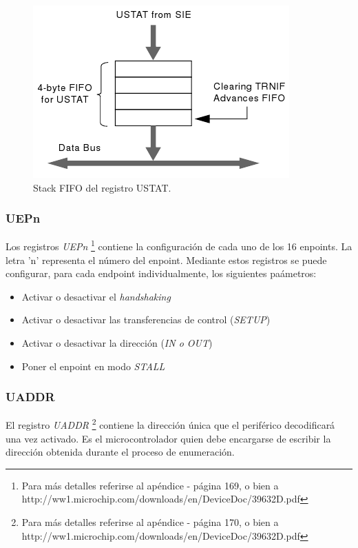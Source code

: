 \begin{figure}[htp]
\centering
\includegraphics[scale=0.6]{./img/ustat_fifo.png}
\caption{Stack FIFO del registro USTAT.}
\label{fig:ustat_fifo}
\end{figure}

\subsubsection{UEPn}
Los registros \emph{UEPn} \footnote{Para m\'as detalles referirse al
ap\'endice - 
p\'agina 169, o bien a
http://ww1.microchip.com/downloads/en/DeviceDoc/39632D.pdf} contiene la
configuraci\'on de cada uno de los 16 enpoints. La letra 'n' representa el
n\'umero del enpoint.
Mediante estos registros se puede configurar, para cada endpoint
individualmente, los siguientes pa\'ametros:

\begin{itemize}
 \item Activar o desactivar el \emph{handshaking}

 \item Activar o desactivar las transferencias de control (\emph{SETUP})

 \item Activar o desactivar la direcci\'on (\emph{IN o OUT})

 \item Poner el enpoint en modo \emph{STALL}
\end{itemize}


\subsubsection{UADDR}
El registro \emph{UADDR} \footnote{Para m\'as detalles referirse al
ap\'endice - 
p\'agina 170, o bien a
http://ww1.microchip.com/downloads/en/DeviceDoc/39632D.pdf} contiene la
direcci\'on \'unica que el perif\'erico decodificar\'a una vez activado. Es el
microcontrolador quien debe encargarse de escribir la direcci\'on obtenida
durante el proceso de enumeraci\'on.

